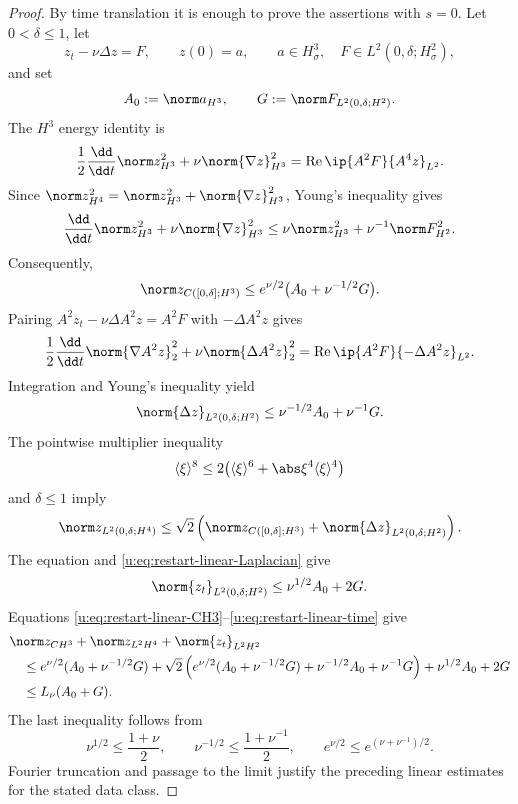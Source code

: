 \begin{proof}
By time translation it is enough to prove the assertions with \(s=0\).
Let \(0<\delta\le1\), let
\[
 z_t-\nu\Delta z=F,
 \qquad z(0)=a,
 \qquad
 a\in H^3_\sigma,\quad
 F\in L^2(0,\delta;H^2_\sigma),
\]
and set
\[
 A_0:=\norm a_{H^3},
 \qquad
 G:=\norm F_{L^2(0,\delta;H^2)}.
\]
The \(H^3\) energy identity is
\[
 \frac12\frac{\dd}{\dd t}\norm z_{H^3}^2
 +\nu\norm{\nabla z}_{H^3}^2
 =\operatorname{Re}\ip{A^2F}{A^4z}_{L^2}.
\]
Since
\(\norm z_{H^4}^2=\norm z_{H^3}^2+\norm{\nabla z}_{H^3}^2\),
Young's inequality gives
\[
 \frac{\dd}{\dd t}\norm z_{H^3}^2
 +\nu\norm{\nabla z}_{H^3}^2
 \le \nu\norm z_{H^3}^2+\nu^{-1}\norm F_{H^2}^2.
\]
Consequently,
\begin{equation}
 \norm z_{C([0,\delta];H^3)}
 \le e^{\nu/2}\bigl(A_0+\nu^{-1/2}G\bigr).
 \label{u:eq:restart-linear-CH3}
\end{equation}
Pairing \(A^2z_t-\nu\Delta A^2z=A^2F\) with
\(-\Delta A^2z\) gives
\[
 \frac12\frac{\dd}{\dd t}\norm{\nabla A^2z}_2^2
 +\nu\norm{\Delta A^2z}_2^2
 =\operatorname{Re}\ip{A^2F}{-\Delta A^2z}_{L^2}.
\]
Integration and Young's inequality yield
\begin{equation}
 \norm{\Delta z}_{L^2(0,\delta;H^2)}
 \le \nu^{-1/2}A_0+\nu^{-1}G.
 \label{u:eq:restart-linear-Laplacian}
\end{equation}
The pointwise multiplier inequality
\[
 \langle\xi\rangle^8
 \le2\bigl(\langle\xi\rangle^6
       +\abs\xi^4\langle\xi\rangle^4\bigr)
\]
and \(\delta\le1\) imply
\begin{equation}
 \norm z_{L^2(0,\delta;H^4)}
 \le\sqrt2\left(
 \norm z_{C([0,\delta];H^3)}
 +\norm{\Delta z}_{L^2(0,\delta;H^2)}
 \right).
 \label{u:eq:restart-linear-H4}
\end{equation}
The equation and \eqref{u:eq:restart-linear-Laplacian} give
\begin{equation}
 \norm{z_t}_{L^2(0,\delta;H^2)}
 \le\nu^{1/2}A_0+2G.
 \label{u:eq:restart-linear-time}
\end{equation}
Equations \eqref{u:eq:restart-linear-CH3}--\eqref{u:eq:restart-linear-time}
give
\begin{align*}
 &\norm z_{C H^3}+\norm z_{L^2H^4}+\norm{z_t}_{L^2H^2}\\
 &\quad\le
 e^{\nu/2}(A_0+\nu^{-1/2}G)
 +\sqrt2\left(
 e^{\nu/2}(A_0+\nu^{-1/2}G)
 +\nu^{-1/2}A_0+\nu^{-1}G\right)
 +\nu^{1/2}A_0+2G\\
 &\quad\le L_\nu(A_0+G).
\end{align*}
The last inequality follows from
\[
 \nu^{1/2}\le\frac{1+\nu}{2},
 \qquad
 \nu^{-1/2}\le\frac{1+\nu^{-1}}2,
 \qquad
 e^{\nu/2}\le e^{(\nu+\nu^{-1})/2}.
\]
Fourier truncation and passage to the limit justify the preceding linear
estimates for the stated data class.


\end{proof}
